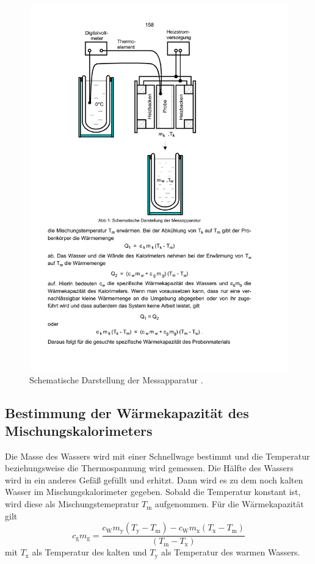 \begin{figure}
  \centering
  \includegraphics[scale=0.6]{content/aufbau.pdf}
\caption{Schematische Darstellung der Messapparatur \cite{anleitung201}.}
  \label{fig:aufbau}
\end{figure}

\subsection{Bestimmung der Wärmekapazität des Mischungskalorimeters}
Die Masse des Wassers wird mit einer Schnellwage bestimmt und die Temperatur beziehungsweise die Thermospannung wird gemessen. Die Hälfte des Wassers wird in ein anderes Gefäß gefüllt und erhitzt. Dann wird es zu dem noch kalten Wasser im Mischungskalorimeter gegeben. Sobald die Temperatur konstant ist, wird diese als Mischungstemepratur $T_\mathrm{m}$ aufgenommen.
Für die Wärmekapazität gilt
\begin{equation}
  c_\mathrm{g}m_\mathrm{g} = \frac{c_\mathrm{W}m_\mathrm{y}(T_\mathrm{y} - T_\mathrm{m}) - c_\mathrm{W}m_\mathrm{x}(T_\mathrm{x} - T_\mathrm{m})}{(T_\mathrm{m} - T_\mathrm{x})}
\end{equation}
mit $T_\mathrm{x}$ als Temperatur des kalten und $T_\mathrm{y}$ als Temperatur des warmen Wassers. 

